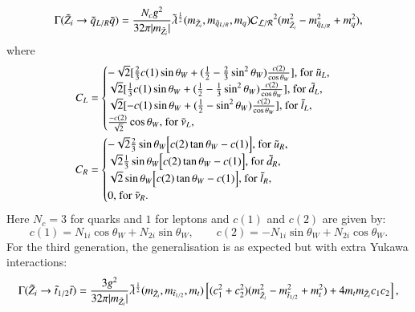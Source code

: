 \documentclass[final,3p,times]{elsarticle}
\begin{document}
\begin{equation} \label{neutqLRqNMSSM}
\Gamma(\tilde{Z}_i \rightarrow \tilde{q}_{L/R} \bar{q}) = {N_{c} g^2 \over 32 \pi |m_{\tilde{Z}_i}|} \tilde{\lambda}^{1 \over 2}(m_{\tilde{Z}_i},m_{\tilde{q}_{L/R}}, m_{q}) \mathcal{C_{L/R}}^2 (m_{\tilde{Z}_i}^2 - m_{\tilde{q}_{L/R}}^2 + m_{q}^2),
\end{equation}
where
\begin{align}
C_{L} &= \begin{cases}
		-\sqrt{2}[{2 \over 3} c(1) \sin\theta_W + ({1 \over 2} - {2 \over 3}\sin^2 \theta_W) {c(2) \over \cos\theta_W}] $, for $\tilde{u}_L$,$ \\
		\sqrt{2}[{1 \over 3} c(1) \sin\theta_W + ({1 \over 2} - {1 \over 3}\sin^2 \theta_W) {c(2) \over \cos\theta_W}] $, for $\tilde{d}_L$,$ \\
		\sqrt{2}[-c(1) \sin\theta_W + ({1 \over 2} - \sin^2 \theta_W) {c(2) \over \cos\theta_W}] $, for $\tilde{l}_L$,$ \\
 		{-c(2) \over \sqrt{2}} \cos\theta_W $, for $\tilde{\nu}_L$,$ \\
 		\end{cases} \\
C_{R} &= \begin{cases}
		-\sqrt{2}{2 \over 3} \sin\theta_W \Big[c(2) \tan\theta_W - c(1)\Big] $, for $\tilde{u}_R $,$\\
		\sqrt{2}{1 \over 3} \sin\theta_W \Big[c(2) \tan\theta_W - c(1)\Big] $, for $\tilde{d}_R $,$\\
		\sqrt{2} \sin\theta_W \Big[c(2) \tan\theta_W - c(1)\Big] $, for $\tilde{l}_R $,$\\
		0 $, for $\tilde{\nu}_R.\\
 		\end{cases}
\end{align}
Here $N_{c} = 3$ for quarks and $1$ for leptons and $c(1)$ and $c(2)$ are given by:
\begin{equation} \label{C1C2NMSSM}
c(1) = N_{1i}\cos\theta_W + N_{2i}\sin\theta_W, \quad \quad 
c(2) = -N_{1i} \sin\theta_W + N_{2i}\cos\theta_W.
\end{equation}
For the third generation, the generalisation is as expected but with extra Yukawa interactions:
\begin{equation} \label{neutsttNMSSM}
\Gamma(\tilde{Z}_i \rightarrow \tilde{t}_{1/2} \bar{t}) = {3 g^2 \over 32\pi |m_{\tilde{Z}_i}|} \tilde{\lambda}^{1 \over 2}(m_{\tilde{Z}_i},m_{\tilde{t}_{1/2}}, m_{t})\left[(c_{1}^2 + c_{2}^2)(m_{\tilde{Z}_i}^2 - m_{\tilde{t}_{1/2}}^2 + m_{t}^2) + 4m_{t}m_{\tilde{Z}_i}c_{1}c_{2}\right],
\end{equation}
\end{document}

